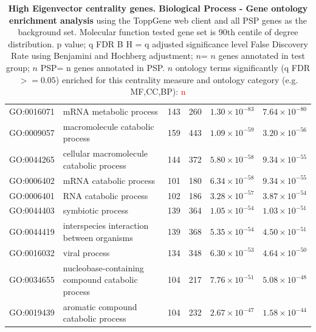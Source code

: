 \begin{table}[ht]
\begin{adjustbox}{width=\textwidth}
\begin{tabular}{@{}clllcl@{}}
  \midrule
GO:0016071 & mRNA metabolic process & 143 & 260 & $1.30 \times 10^{-83}$ & $7.64 \times 10^{-80}$ \\ 
  GO:0009057 & macromolecule catabolic process & 159 & 443 & $1.09 \times 10^{-59}$ & $3.20 \times 10^{-56}$ \\ 
  GO:0044265 & cellular macromolecule catabolic process & 144 & 372 & $5.80 \times 10^{-58}$ & $9.34 \times 10^{-55}$ \\ 
  GO:0006402 & mRNA catabolic process & 101 & 180 & $6.34 \times 10^{-58}$ & $9.34 \times 10^{-55}$ \\ 
  GO:0006401 & RNA catabolic process & 102 & 186 & $3.28 \times 10^{-57}$ & $3.87 \times 10^{-54}$ \\ 
  GO:0044403 & symbiotic process & 139 & 364 & $1.05 \times 10^{-54}$ & $1.03 \times 10^{-51}$ \\ 
  GO:0044419 & interspecies interaction between organisms & 139 & 368 & $5.35 \times 10^{-54}$ & $4.50 \times 10^{-51}$ \\ 
  GO:0016032 & viral process & 134 & 348 & $6.30 \times 10^{-53}$ & $4.64 \times 10^{-50}$ \\ 
  GO:0034655 & nucleobase-containing compound catabolic process & 104 & 217 & $7.76 \times 10^{-51}$ & $5.08 \times 10^{-48}$ \\ 
  GO:0019439 & aromatic compound catabolic process & 104 & 232 & $2.67 \times 10^{-47}$ & $1.58 \times 10^{-44}$ \\ 
   \bottomrule
\end{tabular}
\end{adjustbox}
\caption[Gene ontology enrichment High Eigenvector centrality genes Biological Process of genes above 90th centile of distribution]{\textbf{High Eigenvector centrality genes. Biological Process - Gene ontology enrichment analysis} using the ToppGene web client and all PSP genes as the background set.  Molecular function tested gene set is 90th centile of degree distribution.  p value; q FDR B H = q adjusted significance level False Discovery Rate using Benjamini and Hochberg adjustment; $n$= $n$ genes annotated in test group; $n$ PSP= n genes annotated in PSP. $n$ ontology terms significantly (q FDR$>=0.05$) enriched for this centrality measure and ontology category (e.g. MF,CC,BP): \textcolor{red}{n}} 
\label{tab:ToppGENE GO: Biological Process. 90 centile cw psp eig.txtp = p value; q FDR B H = q adjusted significance level False Discovery Rate using Benjamini and Hochberg adjustment; n= n genes annotated in test group; n PSP= n genes annotated in PSP}
\end{table}


